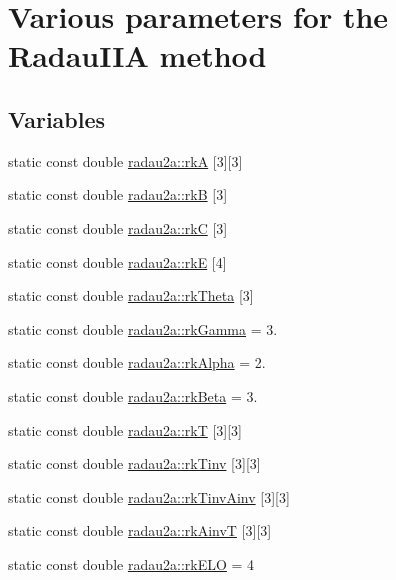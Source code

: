 \hypertarget{group__RK__Params}{}\section{Various parameters for the Radau\+I\+IA method}
\label{group__RK__Params}
\subsection*{Variables}
\begin{DoxyCompactItemize}
\item 
static const double \hyperlink{group__RK__Params_ga37314d1d93d3f053f469c40c5d42a43e}{radau2a\+::rkA} \mbox{[}3\mbox{]}\mbox{[}3\mbox{]}
\item 
static const double \hyperlink{group__RK__Params_gaefb80779066572ac8b1e549cf1293de1}{radau2a\+::rkB} \mbox{[}3\mbox{]}
\item 
static const double \hyperlink{group__RK__Params_ga7e8fecc1a981ceff1796a595b0ef5b4a}{radau2a\+::rkC} \mbox{[}3\mbox{]}
\item 
static const double \hyperlink{group__RK__Params_gae792ec3177ed6d29903669bcde591f94}{radau2a\+::rkE} \mbox{[}4\mbox{]}
\item 
static const double \hyperlink{group__RK__Params_ga905a164e07054850af60562b36b1aa9f}{radau2a\+::rk\+Theta} \mbox{[}3\mbox{]}
\item 
static const double \hyperlink{group__RK__Params_ga188fa0b309eb2826403d911684735824}{radau2a\+::rk\+Gamma} = 3.
\item 
static const double \hyperlink{group__RK__Params_gab60c47377f4985db23effa46e2239c24}{radau2a\+::rk\+Alpha} = 2.
\item 
static const double \hyperlink{group__RK__Params_ga9a1ddba0cd8b29630b2c005af061c656}{radau2a\+::rk\+Beta} = 3.
\item 
static const double \hyperlink{group__RK__Params_gac217dadb5a83f73958dba436ae4fa415}{radau2a\+::rkT} \mbox{[}3\mbox{]}\mbox{[}3\mbox{]}
\item 
static const double \hyperlink{group__RK__Params_ga967c2bc749d9b8cda1585bf4ee50b1c1}{radau2a\+::rk\+Tinv} \mbox{[}3\mbox{]}\mbox{[}3\mbox{]}
\item 
static const double \hyperlink{group__RK__Params_ga048232e984719eb1fed3f8ba7fb4c25b}{radau2a\+::rk\+Tinv\+Ainv} \mbox{[}3\mbox{]}\mbox{[}3\mbox{]}
\item 
static const double \hyperlink{group__RK__Params_gaf7c73eb3be684541be92d125fef651bc}{radau2a\+::rk\+AinvT} \mbox{[}3\mbox{]}\mbox{[}3\mbox{]}
\item 
static const double \hyperlink{group__RK__Params_ga8f0bf108626219e500ffe0b78c01b246}{radau2a\+::rk\+E\+LO} = 4
\end{DoxyCompactItemize}


